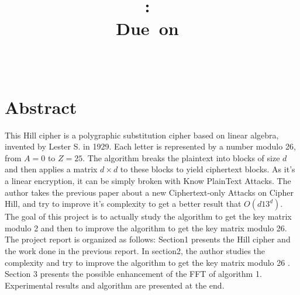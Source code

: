 \documentclass{article}
\title{
\vspace{2in}
\textmd{\textbf{\hmwkClass:\ \hmwkTitle}}\\
\normalsize\vspace{0.1in}\small{Due\ on\ \hmwkDueDate}\\
\vspace{0.1in}\large{\textit{\hmwkClassInstructor\ \hmwkClassTime}}
\vspace{3in}
}
\author{\textbf{\hmwkAuthorName}}
\date{} %
\begin{document}
\maketitle


\newpage
\section{Abstract}
This Hill cipher is a polygraphic substitution cipher based on linear algebra, invented by 
Lester S. in 1929. Each letter is represented by a number modulo 26, from $A=0$ to $Z=25$. The algorithm breaks the plaintext into blocks of size $d$ and then applies a matrix $d \times d $ to these blocks to yield ciphertext blocks. As it's a linear encryption, it can be simply broken with Know PlainText Attacks.
The author takes the previous paper about a new Ciphertext-only Attacks on Cipher Hill, and try to improve it's complexity to get a better result that $O(d13^d)$.\\
${}$\hspace{1em}The goal of this project is to actually study the algorithm to get the key matrix modulo 2 and then to improve the algorithm to get the key matrix modulo 26.\\
${}$\hspace{1em}The project report is organized as follows: Section1 presents the Hill cipher and the work done in the previous report. In section2, the author studies the complexity and try to improve the algorithm to get the key matrix modulo 26 . Section 3 presents the possible enhancement of the FFT of algorithm 1. Experimental results and algorithm are presented at the end.



\newpage
\tableofcontents
\newpage





\end{document}
